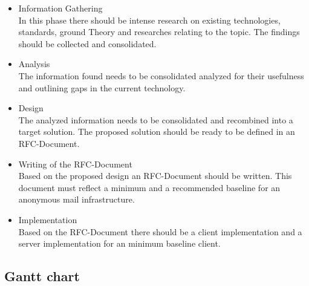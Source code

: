 \documentclass[11pt,a4paper]{article}
\begin{document}
\begin{itemize}
	\item Information Gathering\\
	      In this phase there should be intense research on existing technologies, standards, ground Theory and researches relating to the topic. The findings should be collected and consolidated.
	\item Analysis\\
				The information found needs to be consolidated analyzed for their usefulness and outlining gaps in the current technology.
	\item Design\\
				The analyzed information needs to be consolidated and recombined into a target solution. The proposed solution should be ready to be defined in an RFC-Document.
	\item Writing of the RFC-Document\\
				Based on the proposed design an RFC-Document should be written. This document must reflect a minimum and a recommended baseline for an anonymous mail infrastructure.
	\item Implementation\\
				Based on the RFC-Document there should be a client implementation and a server implementation for an minimum baseline client.
\end{itemize}
\begin{landscape}
\section{Gantt chart}
\end{landscape}
\end{document}
